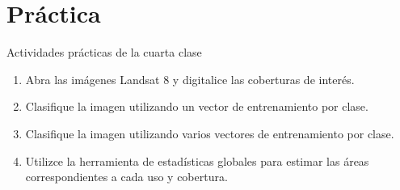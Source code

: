 \documentclass[handout,draft]{beamer}
\begin{document}
\section{Pr\'actica}

\begin{frame}{\secname}
  \begin{exampleblock}{Actividades pr\'acticas de la cuarta clase}
    \begin{enumerate}[<+>]
      \item Abra las im\'agenes Landsat 8 y digitalice las coberturas de inter\'es.
      \item Clasifique la imagen utilizando un vector de entrenamiento por clase.
      \item Clasifique la imagen utilizando varios vectores de entrenamiento por clase.
      \item Utilizce la herramienta de estad\'isticas globales para estimar las \'areas correspondientes a cada uso y cobertura.
    \end{enumerate}
  \end{exampleblock}
\end{frame}
\end{document}
